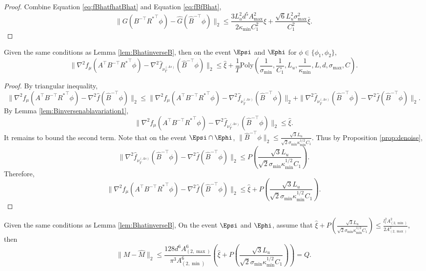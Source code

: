 \begin{proof}
Combine Equation \eqref{eq:fBhatfhatBhat} and Equation \eqref{eq:fBfBhat},
\[
\|G(B^{-\top}{R^*}^{\top}\phi) - \hat{G}(\hat{B}^{-\top}\phi)\|_2
\le 
\frac{3L_u^2d^5A^2_{\max}}{2\kappa_{\min}C_1^2}\xi + \frac{\sqrt{6}L_u^2\sigma_{\max}^2}{C_1^2}\bar{\xi}.
\]
\end{proof}

\begin{lemma}
\label{lem:Binversenablavariation2}
Given the same conditions as Lemma \ref{lem:BhatinverseB}, then on the event $\Epsi$ and $\Ephi$ for $\phi \in \{\phi_1, \phi_2\}$,
\[
\|\nabla^2 f_{\mu}(A^{\top}B^{-\top}{R^*}^{\top}\phi) - \nabla^2 \hat{f}_{\nu_T^{(As)}}(\hat{B}^{-\top}\phi)  \|_2 
\le
 \hat{\xi}
+
\frac{1}{T}\text{Poly}\left(\frac{1}{\sigma_{\min}}, \frac{1}{C_1}, L_u, \frac{1}{\kappa_{\min}}, L, d, \sigma_{\max}, C\right).
\]
\end{lemma}
\begin{proof}
By triangular inequality, 
\[
\|\nabla^2 f_{\mu}(A^{\top}B^{-\top}{R^*}^{\top}\phi) - \nabla^2 \hat{f}(\hat{B}^{-\top}\phi)  \|_2 
\le 
\|\nabla^2 f_{\mu}(A^{\top}B^{-\top}{R^*}^{\top}\phi) - \nabla^2 \hat{f}_{\nu_T^{(As)}}(\hat{B}^{-\top}\phi)  \|_2 
+
\|\nabla^2 \hat{f}_{\nu_T^{(As)}}(\hat{B}^{-\top}\phi) - \nabla^2 \hat{f}(\hat{B}^{-\top}\phi)  \|_2. 
\]
By Lemma \ref{lem:Binversenablavariation1}, 
\[
\|\nabla^2 f_{\mu}(A^{\top}B^{-\top}{R^*}^{\top}\phi) - \nabla^2 \hat{f}_{\nu_T^{(As)}}(\hat{B}^{-\top}\phi)  \|_2 
\le \hat{\xi}. 
\]
It remains to bound the second term. 
Note that on the event $\Epsi\cap\Ephi$, $\|\hat{B}^{-\top}\phi\|_2 \le \frac{\sqrt{3}L_u}{\sqrt{2}\sigma_{\min}\kappa_{\min}^{1/2}C_1}$. 
Thus by Proposition \ref{prop:denoise}, 
\[
\|\nabla^2 \hat{f}_{\nu_T^{(As)}}(\hat{B}^{-\top}\phi) - \nabla^2 \hat{f}(\hat{B}^{-\top}\phi)  \|_2 \le P\left(\frac{\sqrt{3}L_u}{\sqrt{2}\sigma_{\min}\kappa_{\min}^{1/2}C_1}\right).
\]
Therefore, 
\[
\|\nabla^2 f_{\mu}(A^{\top}B^{-\top}{R^*}^{\top}\phi) - \nabla^2 \hat{f}(\hat{B}^{-\top}\phi)  \|_2 
\le 
 \hat{\xi}
+
P\left(\frac{\sqrt{3}L_u}{\sqrt{2}\sigma_{\min}\kappa_{\min}^{1/2}C_1}\right).
\]
\end{proof}
\begin{lemma}
\label{lem:Tvariantion}
Given the same conditions as Lemma \ref{lem:BhatinverseB}, On the event $\Epsi$ and $\Ephi$, assume that $\hat{\xi}
+
P\left(\frac{\sqrt{3}L_u}{\sqrt{2}\sigma_{\min}\kappa_{\min}^{1/2}C_1}\right)\le \frac{l_l^2 A^2_{(2,\min)}}{2A^2_{(2,\max)}}$, then 
\[
\|M - \hat{M}\|_2 \le  \frac{128d^6A^6_{(2,\max)}}{\pi^3 A^6_{(2,\min)}}\left(\hat{\xi}+
P\left(\frac{\sqrt{3}L_u}{\sqrt{2}\sigma_{\min}\kappa_{\min}^{1/2}C_1}\right)\right) = Q.
\]
\end{lemma}

